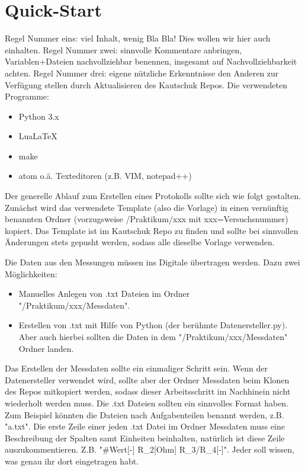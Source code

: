 \section{Quick-Start}
\label{sec:qs}

Regel Nummer eins: viel Inhalt, wenig Bla Bla! Dies wollen wir hier auch einhalten. Regel Nummer zwei: sinnvolle Kommentare anbringen, Variablen+Dateien nachvollziehbar benennen, insgesamt auf Nachvollziehbarkeit achten. Regel Nummer drei: eigene nützliche Erkenntnisse den Anderen zur Verfügung stellen durch Aktualisieren des Kautschuk Repos. Die verwendeten Programme:
\begin{itemize}
  \item Python 3.x
  \item LuaLaTeX
  \item make
  \item atom o.ä. Texteditoren (z.B. VIM, notepad++)
\end{itemize}
Der generelle Ablauf zum Erstellen eines Protokolls sollte sich wie folgt gestalten. Zunächst wird das verwendete Template (also die Vorlage) in einen vernünftig benannten Ordner (vorzugsweise /Praktikum/xxx  mit xxx=Versuchsnummer) kopiert. Das Template ist im Kautschuk Repo zu finden und sollte bei sinnvollen Änderungen stets gepusht werden, sodass alle dieselbe Vorlage verwenden.

Die Daten aus den Messungen müssen ins Digitale übertragen werden. Dazu zwei Möglichkeiten:
\begin{itemize}
  \item Manuelles Anlegen von .txt Dateien im Ordner "/Praktikum/xxx/Messdaten".
  \item Erstellen von .txt mit Hilfe von Python (der berühmte Datenersteller.py). Aber auch hierbei sollten die Daten in dem "/Praktikum/xxx/Messdaten" Ordner landen.
\end{itemize}
Das Erstellen der Messdaten sollte ein einmaliger Schritt sein. Wenn der Datenersteller verwendet wird, sollte aber der Ordner Messdaten beim Klonen des Repos mitkopiert werden, sodass dieser Arbeitsschritt im Nachhinein nicht wiederholt werden muss. Die .txt Dateien sollten ein sinnvolles Format haben. Zum Beispiel könnten die Dateien nach Aufgabenteilen benannt werden, z.B. "a.txt". Die erste Zeile einer jeden .txt Datei im Ordner Messdaten muss eine Beschreibung der Spalten samt Einheiten beinhalten, natürlich ist diese Zeile auszukommentieren. Z.B. "\#Wert[-] R\_2[Ohm]   R\_3/R\_4[-]". Jeder soll wissen, was genau ihr dort eingetragen habt.

